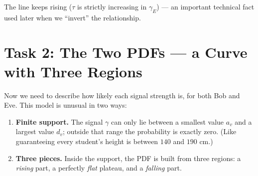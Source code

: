\documentclass[11pt]{article}
\begin{document}
\begin{center}
\end{center}

The line keeps rising ($\tau$ is strictly increasing in $\gamma_E$) --- an important
technical fact used later when we ``invert'' the relationship.

\section{Task 2: The Two PDFs --- a Curve with Three Regions}

Now we need to describe how likely each signal strength is, for both Bob and Eve.
This model is unusual in two ways:

\begin{enumerate}
\item \textbf{Finite support.} The signal $\gamma$ can only lie between a smallest
      value $a_v$ and a largest value $d_v$; outside that range the probability is
      exactly zero. (Like guaranteeing every student's height is between $140$ and
      $190$ cm.)
\item \textbf{Three pieces.} Inside the support, the PDF is built from three regions:
      a \emph{rising} part, a perfectly \emph{flat} plateau, and a \emph{falling} part.
\end{enumerate}
\end{document}

